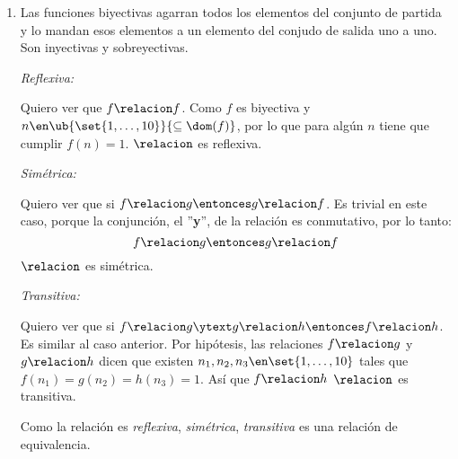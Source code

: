 \begin{enumerate}[label=\roman*)]
  \item Las funciones biyectivas agarran todos los elementos del conjunto de partida y lo mandan esos elementos a un elemento del conjudo de salida uno a uno.
        Son inyectivas y sobreyectivas.

        \bigskip

        \textit{Reflexiva:}\par
        Quiero ver que $f \relacion f$. Como $f$ es biyectiva y $n \en \ub{\set{1,\dots,10}}{ \subseteq \dom(f)}$, por lo que para algún $n$
        tiene que cumplir $f(n) = 1$.
        $\relacion$ es reflexiva.

        \bigskip

        \textit{Simétrica:}\par
        Quiero ver que si $f \relacion g \entonces g \relacion f$. Es trivial en este caso, porque la conjunción, el ''\textbf{y}'', de la relación
        es conmutativo, por lo tanto:
        $$
          f \relacion g \entonces g \relacion f
        $$
        $\relacion$ es simétrica.

        \bigskip

        \textit{Transitiva:}\par
        Quiero ver que si $f \relacion g \ytext g \relacion h \entonces f \relacion h$. Es similar al caso anterior. Por hipótesis, las relaciones
        $f\relacion g$ y $g\relacion h$ dicen que existen $n_1, n_2, n_3 \en \set{1,\dots,10}$ tales que $f(n_1) = g(n_2) = h(n_3) = 1$.
        Así que $f \relacion h$
        $\relacion$ es transitiva.

        Como la relación es \textit{reflexiva}, \textit{simétrica}, \textit{transitiva} es una relación de equivalencia.
        \bigskip


\end{enumerate}
